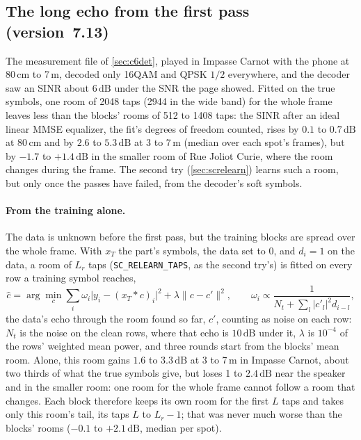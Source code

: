\documentclass[11pt,a4paper]{article}
\newcommand{\dB}{\,\mathrm{dB}}
\newcommand{\code}[1]{\texttt{#1}}
\theoremstyle{remark}
\begin{document}
\subsection{The long echo from the first pass (version~7.13)}
\label{sec:sctail}
The measurement file of \cref{sec:c6det}, played in Impasse Carnot with the phone at 80\,cm to 7\,m, decoded only 16QAM and QPSK $1/2$ everywhere, and the decoder saw an SINR about $6\dB$ under the SNR the page showed. Fitted on the true symbols, one room of 2048 taps (2944 in the wide band) for the whole frame leaves less than the blocks' rooms of 512 to 1408 taps: the SINR after an ideal linear MMSE equalizer, the fit's degrees of freedom counted, rises by $0.1$ to $0.7\dB$ at 80\,cm and by $2.6$ to $5.3\dB$ at 3 to 7\,m (median over each spot's frames), but by $-1.7$ to $+1.4\dB$ in the smaller room of Rue Joliot Curie, where the room changes during the frame. The second try (\cref{sec:screlearn}) learns such a room, but only once the passes have failed, from the decoder's soft symbols.

\paragraph{From the training alone.} The data is unknown before the first pass, but the training blocks are spread over the whole frame. With $x_T$ the part's symbols, the data set to 0, and $d_i = 1$ on the data, a room of $L_r$ taps (\code{SC\_RELEARN\_TAPS}, as the second try's) is fitted on every row a training symbol reaches,
\begin{equation}
\hat c = \arg\min_c \sum_i \omega_i \bigl|y_i - (x_T * c)_i\bigr|^2 + \lambda \|c - c'\|^2, \qquad \omega_i \propto \frac{1}{N_t + \sum_l |c'_l|^2 d_{i-l}},
\end{equation}
the data's echo through the room found so far, $c'$, counting as noise on each row: $N_t$ is the noise on the clean rows, where that echo is $10\dB$ under it, $\lambda$ is $10^{-4}$ of the rows' weighted mean power, and three rounds start from the blocks' mean room. Alone, this room gains $1.6$ to $3.3\dB$ at 3 to 7\,m in Impasse Carnot, about two thirds of what the true symbols give, but loses 1 to $2.4\dB$ near the speaker and in the smaller room: one room for the whole frame cannot follow a room that changes. Each block therefore keeps its own room for the first $L$ taps and takes only this room's tail, its taps $L$ to $L_r - 1$; that was never much worse than the blocks' rooms ($-0.1$ to $+2.1\dB$, median per spot).
\end{document}
